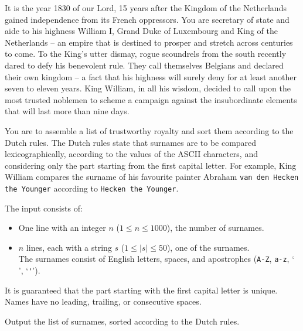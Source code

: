 \problemname{}


\newcommand{\maxn}{1000}
\newcommand{\maxs}{50}

It is the year 1830 of our Lord, 15 years after the Kingdom of the Netherlands gained independence from its French oppressors.
You are secretary of state and aide to his highness William I, Grand Duke of Luxembourg and King of the Netherlands --
an empire that is destined to prosper and stretch across centuries to come.
To the King's utter dismay, rogue scoundrels from the south recently dared to defy his benevolent rule.
They call themselves Belgians and declared their own kingdom --
a fact that his highness will surely deny for at least another seven to eleven years.
King William, in all his wisdom, decided to call upon the most trusted noblemen to scheme a campaign against the insubordinate elements that will last more than nine days.

You are to assemble a list of trustworthy royalty and sort them according to the Dutch rules.
The Dutch rules state that surnames are to be compared lexicographically, according to the values of the ASCII characters, and considering only the part starting from the first capital letter.
For example, King William compares the surname of his favourite painter Abraham \texttt{van den Hecken the Younger} according to \texttt{Hecken the Younger}.


\begin{Input}
    The input consists of:
    \begin{itemize}
        \item One line with an integer $n$ ($1\leq n\leq \maxn$), the number of surnames.
        \item $n$ lines, each with a string $s$ ($1\leq |s|\leq\maxs$), one of the surnames. \\
            The surnames consist of English letters, spaces, and apostrophes
            (\texttt{A-Z}, \texttt{a-z}, `\texttt{ }', `\verb|'|').
    \end{itemize}
    It is guaranteed that the part starting with the first capital letter is unique.
    Names have no leading, trailing, or consecutive spaces.
\end{Input}

\begin{Output}
    Output the list of surnames, sorted according to the Dutch rules.
\end{Output}

